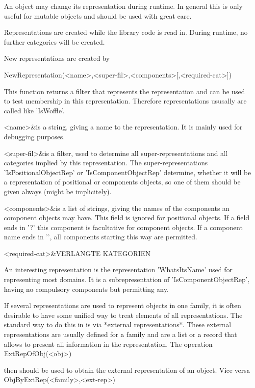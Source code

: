 \danger
An object may change its representation during runtime. In general this is
only useful for mutable objects and should be used with great care.

\danger
Representations are created while the library code is read in. During runtime,
no further categories will be created.

New representations are created by 

\>NewRepresentation(<name>,<super-fil>,<components>[,<required-cat>])

This function returns a filter that represents the representation and can be
used to test membership in this representation.
Therefore representations ususally are called like 'IsWoffle'.

\beginitems
<name>&is a string, giving a name to the representation. It is mainly used for
debugging purposes.

<super-fil>&is a filter, used to determine all super-representations and all 
categories implied by this representation. The super-representations
'IsPositionalObjectRep' or 'IsComponentObjectRep' determine, whether it will
be a representation of positional or components objects, so one of them
should be given always (might be implicitely).

<components>&is a list of strings, giving the names of the components an
component objects may have. This field is ignored for positional objects.
If a field ends in '?' this component is facultative for component objects.
If a component name ends in '\*', all components starting this way are
permitted.

<required-cat>&VERLANGTE KATEGORIEN
\enditems

\danger
An interesting representation is the representation 'WhatsItsName' used for
representing most domains. It is a subrepresentation of
'IsComponentObjectRep', having no compulsory components but permitting any.

\danger
If several representations are used to represent objects in one family, it
is often desirable to have some unified way to treat elements of all
representations. The standard way to do this in {\GAP} is via *external
representations*. These external representations are usually defined for a
family and are a list or a record that allows to present all information in
the representation. The operation 
\>ExtRepOfObj(<obj>)

then should be used to obtain the external representation of
an object. Vice versa 
\>ObjByExtRep(<family>,<ext-rep>)

